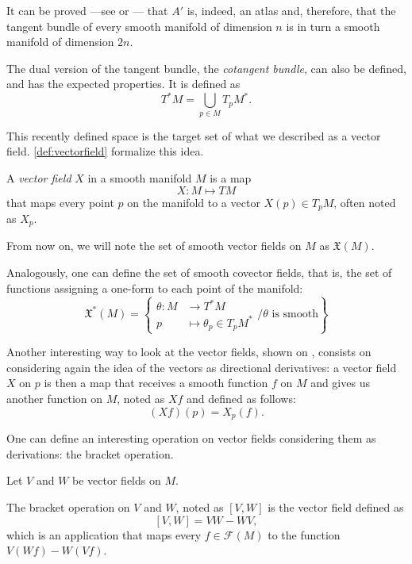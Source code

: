 It can be proved ---see \cite[Example 2.1]{docarmo79} or \cite[pp. 26, 27]{oneill83}--- that $A'$ is, indeed, an atlas and, therefore, that the tangent bundle of every smooth manifold of dimension $n$ is in turn a smooth manifold of dimension $2n$.

\begin{remark}
	The dual version of the tangent bundle, the \emph{cotangent bundle}, can also be defined, and has the expected properties. It is defined as
	\[
		T^*M = \bigcup_{p \in M} T_p M^*.
	\]
\end{remark}

This recently defined space is the target set of what we described as a vector field. \autoref{def:vectorfield} formalize this idea.

\begin{definition}
	\label{def:vectorfield}
	A \emph{vector field} $X$ in a smooth manifold $M$ is a map
	\[
		X \colon M \mapsto TM
	\]
	that maps every point $p$ on the manifold to a vector $X(p) \in T_p M$, often noted as $X_p$.
\end{definition}

From now on, we will note the set of smooth vector fields on $M$ as $\mathfrak{X}(M)$.

Analogously, one can define the set of smooth covector fields, that is, the set of functions assigning a one-form to each point of the manifold:
\[
	\mathfrak{X}^*(M) = \left\{ \begin{aligned}
		\theta \colon M &\to T^*M \\
		p &\mapsto \theta_p \in T_p M^*
	\end{aligned} \Bigg/ \theta \textrm{ is smooth} \right\}
\]

Another interesting way to look at the vector fields, shown on \cite[p. 23]{docarmo79}, consists on considering again the idea of the vectors as directional derivatives: a vector field $X$ on $p$ is then a map that receives a smooth function $f$ on $M$ and gives us another function on $M$, noted as $Xf$ and defined as follows:
\[
	(Xf)(p) = X_p(f).
\]

One can define an interesting operation on vector fields considering them as derivations: the bracket operation.

\begin{definition}
	Let $V$ and $W$ be vector fields on $M$.
	
	The bracket operation on $V$ and $W$, noted as $[V, W]$ is the vector field defined as
	\[
		[V, W] = VW - WV,
	\]
	which is an application that maps every $f \in \mathcal{F}(M)$ to the function $V(Wf) - W(Vf)$.
\end{definition}

